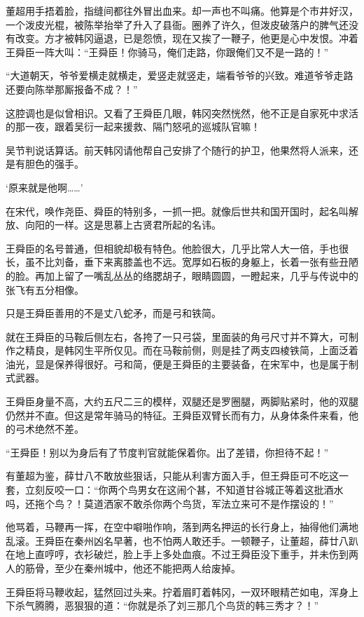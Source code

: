 董超用手捂着脸，指缝间都往外冒出血来。却一声也不叫痛。他算是个市井好汉，一个泼皮光棍，被陈举抬举了升入了县衙。圈养了许久，但泼皮破落户的脾气还没有改变。方才被韩冈逼退，已是怨愤，现在又挨了一鞭子，他更是心中发恨。冲着王舜臣一阵大叫：“王舜臣！你骑马，俺们走路，你跟俺们又不是一路的！”

“大道朝天，爷爷爱横走就横走，爱竖走就竖走，端看爷爷的兴致。难道爷爷走路还要向陈举那厮报备不成？！”

这腔调也是似曾相识。又看了王舜臣几眼，韩冈突然恍然，他不正是自家死中求活的那一夜，跟着吴衍一起来援救、隔门怒吼的巡城队官嘛！

吴节判说话算话。前天韩冈请他帮自己安排了个随行的护卫，他果然将人派来，还是有胆色的强手。

‘原来就是他啊……’

在宋代，唤作尧臣、舜臣的特别多，一抓一把。就像后世共和国开国时，起名叫解放、向阳的一样。这是思慕上古贤君所起的名讳。

王舜臣的名号普通，但相貌却极有特色。他脸很大，几乎比常人大一倍，手也很长，虽不比刘备，垂下来离膝盖也不远。宽厚如石板的身躯上，长着一张有些丑陋的脸。再加上留了一嘴乱丛丛的络腮胡子，眼睛圆圆，一瞪起来，几乎与传说中的张飞有五分相像。

只是王舜臣善用的不是丈八蛇矛，而是弓和铁简。

就在王舜臣的马鞍后侧左右，各挎了一只弓袋，里面装的角弓尺寸并不算大，可制作之精良，是韩冈生平所仅见。而在马鞍前侧，则是挂了两支四棱铁简，上面泛着油光，显是保养得很好。弓和简，便是王舜臣的主要装备，在宋军中，也是属于制式武器。

王舜臣身量不高，大约五尺二三的模样，双腿还是罗圈腿，两脚贴紧时，他的双腿仍然并不直。但这是常年骑马的特征。王舜臣双臂长而有力，从身体条件来看，他的弓术绝然不差。

“王舜臣！别以为身后有了节度判官就能保着你。出了差错，你担待不起！”

有董超为鉴，薛廿八不敢放些狠话，只能从利害方面入手，但王舜臣可不吃这一套，立刻反咬一口：“你两个鸟男女在这闹个甚，不知道甘谷城正等着这批酒水吗，还拖个鸟？！莫道洒家不敢杀你两个鸟货，军法立来可不是作摆设的！”

他骂着，马鞭再一挥，在空中噼啪作响，落到两名押运的长行身上，抽得他们满地乱滚。王舜臣在秦州凶名早著，也不怕两人敢还手。一顿鞭子，让董超，薛廿八趴在地上直哼哼，衣衫破烂，脸上手上多处血痕。不过王舜臣没下重手，并未伤到两人的筋骨，至少在秦州城中，他还不能把两人给废掉。

王舜臣将马鞭收起，猛然回过头来。拧着眉盯着韩冈，一双环眼精芒如电，浑身上下杀气腾腾，恶狠狠的道：“你就是杀了刘三那几个鸟货的韩三秀才？！”

